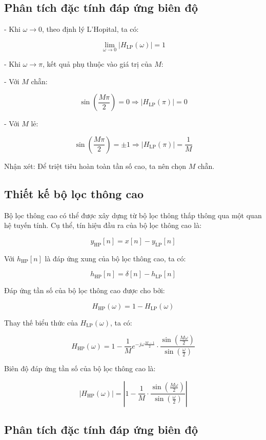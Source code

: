 \subsection*{Phân tích đặc tính đáp ứng biên độ}

- Khi \( \omega \to 0 \), theo định lý L'Hopital, ta có:

\[
\lim_{\omega \to 0} |H_{\mathrm{LP}}(\omega)| = 1
\]

- Khi \( \omega \to \pi \), kết quả phụ thuộc vào giá trị của \( M \):

- Với \( M \) chẵn:

\[
\sin\left(\frac{M\pi}{2}\right) = 0 \Rightarrow |H_{\mathrm{LP}}(\pi)| = 0
\]

- Với \( M \) lẻ:

\[
\sin\left(\frac{M\pi}{2}\right) = \pm 1 \Rightarrow |H_{\mathrm{LP}}(\pi)| = \frac{1}{M}
\]

Nhận xét: Để triệt tiêu hoàn toàn tần số cao, ta nên chọn \( M \) chẵn.

\subsection*{Thiết kế bộ lọc thông cao}

Bộ lọc thông cao có thể được xây dựng từ bộ lọc thông thấp thông qua một quan hệ tuyến tính. Cụ thể, tín hiệu đầu ra của bộ lọc thông cao là:

\[
y_{\mathrm{HP}}[n] = x[n] - y_{\mathrm{LP}}[n]
\]

Với \( h_{\mathrm{HP}}[n] \) là đáp ứng xung của bộ lọc thông cao, ta có:

\[
h_{\mathrm{HP}}[n] = \delta[n] - h_{\mathrm{LP}}[n]
\]

Đáp ứng tần số của bộ lọc thông cao được cho bởi:

\[
H_{\mathrm{HP}}(\omega) = 1 - H_{\mathrm{LP}}(\omega)
\]

Thay thế biểu thức của \( H_{\mathrm{LP}}(\omega) \), ta có:

\[
H_{\mathrm{HP}}(\omega) = 1 - \frac{1}{M} e^{-j \omega \frac{M-1}{2}} \cdot \frac{\sin\left(\frac{M \omega}{2}\right)}{\sin\left(\frac{\omega}{2}\right)}
\]

Biên độ đáp ứng tần số của bộ lọc thông cao là:

\[
|H_{\mathrm{HP}}(\omega)| = \left| 1 - \frac{1}{M} \cdot \frac{\sin\left( \frac{M \omega}{2} \right)}{\sin\left( \frac{\omega}{2} \right)} \right|
\]

\subsection*{Phân tích đặc tính đáp ứng biên độ}

